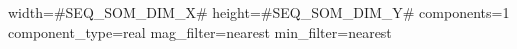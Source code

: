 width=#SEQ_SOM_DIM_X#
height=#SEQ_SOM_DIM_Y#
components=1
component_type=real
mag_filter=nearest
min_filter=nearest
